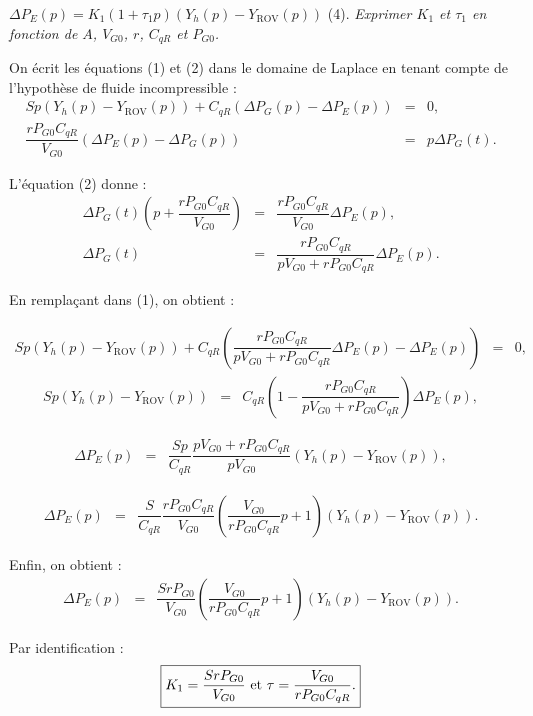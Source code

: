 $\Delta P_E(p) = K_1(1+\tau_1 p)(Y_h(p)-Y_{\text{ROV}}(p))$ (4).
\textit{Exprimer $K_1$ et $\tau_1$ en fonction de $A$, $V_{G0}$, $r$, $C_{qR}$ et $P_{G0}$.}
\ifprof
\begin{corrige}
On écrit les équations (1) et (2) dans le domaine de Laplace en tenant compte de l'hypothèse de fluide incompressible :
 \begin{eqnarray}
{Sp}\left( Y_h(p)-  Y_{\text{ROV}}(p)\right)+C_{qR}\left(\Delta P_G(p)-\Delta P_E(p)\right) &=&0, \\
\dfrac{rP_{G0}C_{qR}}{V_{G0}}\left(\Delta P_E(p)-\Delta P_G(p)\right) &=&p \Delta P_G(t).\nonumber
\end{eqnarray}

L'équation (2) donne :
 \begin{eqnarray}
\Delta P_G(t)\left(p+\dfrac{rP_{G0}C_{qR}}{V_{G0}}\right)&=&\dfrac{rP_{G0}C_{qR}}{V_{G0}}\Delta P_E(p), \nonumber \\
\Delta P_G(t)&=&\dfrac{rP_{G0}C_{qR}}{pV_{G0}+{rP_{G0}C_{qR}}}\Delta P_E(p).\nonumber
\end{eqnarray}

En remplaçant dans (1), on obtient : 

 \begin{eqnarray}
{Sp}\left( Y_h(p)-  Y_{\text{ROV}}(p)\right)+C_{qR}\left(\dfrac{rP_{G0}C_{qR}}{pV_{G0}+{rP_{G0}C_{qR}}}\Delta P_E(p)-\Delta P_E(p)\right) &=&0, \nonumber
\end{eqnarray}
 \begin{eqnarray}
{Sp}\left( Y_h(p)-  Y_{\text{ROV}}(p)\right)&=&C_{qR}\left(1-\dfrac{rP_{G0}C_{qR}}{pV_{G0}+{rP_{G0}C_{qR}}}\right) \Delta P_E(p), \nonumber
\end{eqnarray}

 \begin{eqnarray}
\Delta P_E(p)&=&\dfrac{Sp}{C_{qR}}\dfrac{pV_{G0}+{rP_{G0}C_{qR}}}{pV_{G0} }\left( Y_h(p)-  Y_{\text{ROV}}(p)\right), \nonumber
\end{eqnarray}


 \begin{eqnarray}
\Delta P_E(p)&=&\dfrac{S}{C_{qR}}\dfrac{{rP_{G0}C_{qR}}}{V_{G0} }\left(\dfrac{V_{G0}}{{rP_{G0}C_{qR}} }p+1\right)\left( Y_h(p)-  Y_{\text{ROV}}(p)\right). \nonumber
\end{eqnarray}

Enfin, on obtient :
\begin{eqnarray}
\Delta P_E(p)&=&\dfrac{{SrP_{G0}}}{V_{G0} }\left(\dfrac{V_{G0}}{{rP_{G0}C_{qR}} }p+1\right)\left( Y_h(p)-  Y_{\text{ROV}}(p)\right). \nonumber
\end{eqnarray}


Par identification :
$$\boxed{K_1=\dfrac{SrP_{G0}}{V_{G0}}$ et $\tau=\dfrac{V_{G0}}{rP_{G0}C_{qR}}.}$$

\end{corrige}
\else
\fi


